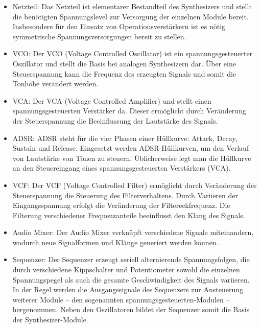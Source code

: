 \begin{itemize}
	\item Netzteil:\newline
	Das Netzteil ist elementarer Bestandteil des Synthesizers und stellt die benötigten Spannungslevel zur Versorgung der einzelnen Module bereit.
	Insbesondere für den Einsatz von Operationsverstärkern ist es nötig symmetrische Spannungsversorgungen bereit zu stellen.
	
	\item VCO: \newline
	Der VCO (Voltage Controlled Oscillator) ist ein spannungsgesteuerter Oszillator und stellt die Basis bei analogen Synthesizern dar.
	Über eine Steuerspannung kann die Frequenz des erzeugten Signals und somit die Tonhöhe verändert werden. 
	\item VCA: \newline
	Der VCA (Voltage Controlled Amplifier) und stellt einen spannungsgesteuerten Verstärker da. 
	Dieser ermöglicht durch Veränderung der Steuerspannung die Beeinflussung der Lautstärke des Signals.
	
	\item ADSR: \newline
	ADSR steht für die vier Phasen einer Hüllkurve: Attack, Decay, Sustain und Release. 
	Eingesetzt werden ADSR-Hüllkurven, um den Verlauf von Lautstärke von Tönen zu steuern. Üblicherweise legt man die Hüllkurve an den Steuereingang eines spannungsgesteuerten Verstärkers (VCA). 
	
	\item VCF: \newline
	Der VCF (Voltage Controlled Filter) ermöglicht durch Veränderung der Steuerspannung die Steuerung des Filterverhaltens.
	Durch Variieren der Eingangsspannung erfolgt die Veränderung der Filtereckfrequenz.
	Die Filterung verschiedener Frequenzanteile beeinflusst den Klang des Signals.
	
	\item Audio Mixer: \newline
	Der Audio Mixer verknüpft verschiedene Signale miteinandern, wodurch neue Signalformen und Klänge generiert werden können.
	
	\item Sequenzer: \newline
	Der Sequenzer erzeugt seriell alternierende Spannungsfolgen, die durch verschiedene Kippschalter und Potentiometer sowohl die einzelnen Spannungspegel als auch die gesamte Geschwindigkeit des Signals variieren. 
	In der Regel werden die Ausgangssignale des Sequenzers zur Ansteuerung weiterer Module – den sogenannten spannungsgesteuerten-Modulen – hergenommen. Neben den Oszillatoren bildet der Sequenzer somit die Basis der Synthesizer-Module.
	

\end{itemize}
